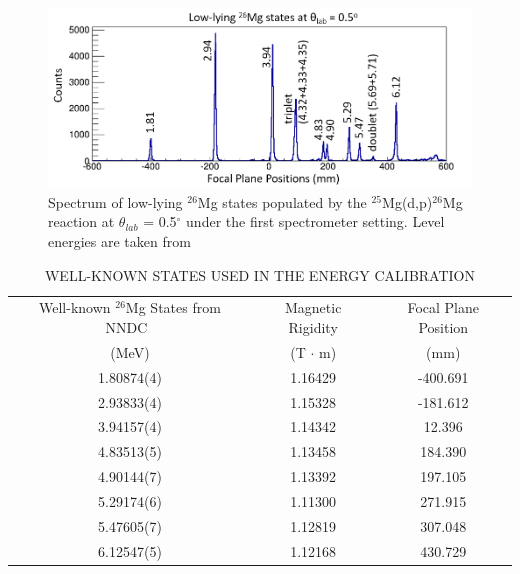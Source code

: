 \begin{figure}[tpb]
  \begin{center}
    \centerline{\includegraphics[scale=0.6]{graph/ch5/mg26_low}}
    \caption{Spectrum of low-lying $^{26}$Mg states populated by the $^{25}$Mg(d,p)$^{26}$Mg reaction at $\theta_{lab}$ = 0.5$^{\circ}$ under the first spectrometer setting. Level energies are taken from\citep{Cujec1964}}
    \label{fig:lowlying}
  \end{center}
\end{figure}

\begin{table}[tpb]
    \setlength{\capwidth}{0.7\textwidth}
    \begin{centering}
       \caption{WELL-KNOWN STATES USED IN THE ENERGY CALIBRATION}
       \label{tb:wellknown_states}
       \begin{tabular}{c c c}
       \toprule
       \toprule
          Well-known $^{26}$Mg States from NNDC~\citep{NNDC}  & Magnetic Rigidity & Focal Plane Position   \\
         (MeV) &(T $\cdot$ m)& (mm) \\
         \hline
         1.80874(4)  & 1.16429 & -400.691   \\
         2.93833(4)  & 1.15328 & -181.612   \\
         3.94157(4)  & 1.14342 & 12.396   \\
         4.83513(5)  & 1.13458 & 184.390   \\
         4.90144(7)  & 1.13392 & 197.105   \\
         5.29174(6)  & 1.11300 & 271.915   \\
         5.47605(7)  & 1.12819 & 307.048   \\
         6.12547(5)  & 1.12168 & 430.729   \\
         \hline
       \end{tabular}
     \end{centering}
\end{table}

